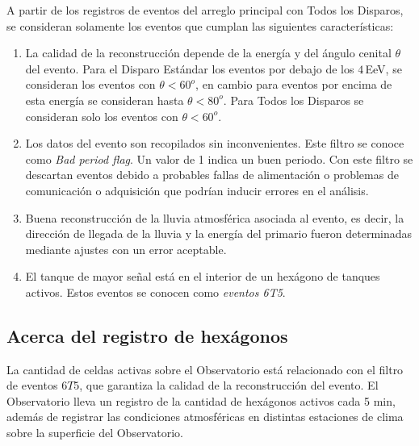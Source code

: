 A partir de los registros de eventos del arreglo principal con Todos los Disparos, se consideran solamente los eventos que cumplan las siguientes características:

    \begin{enumerate}
      \item La calidad de la reconstrucción depende de la energía y del ángulo cenital $\theta$ del evento.  Para el Disparo Estándar los eventos por debajo de los $4\,$EeV, se consideran los eventos con $\theta < 60^o$, en cambio para eventos por encima de esta energía se consideran hasta $\theta < 80^o$. Para Todos los Disparos se consideran solo los eventos con $\theta<60^o$.
      \item Los datos del evento son recopilados sin inconvenientes. Este filtro se conoce como \emph{Bad period flag}. Un valor de 1 indica un buen periodo. Con este filtro se descartan eventos debido a probables fallas de alimentación o problemas de comunicación o adquisición que podrían inducir errores en el análisis.
      \item Buena reconstrucción de la lluvia atmosférica asociada al evento, es decir, la dirección de llegada de la lluvia y la energía del primario fueron determinadas mediante ajustes con un error aceptable.
      \item El tanque de mayor señal está en el interior de un hexágono de tanques activos. Estos eventos se conocen como \textit{eventos 6T5}.
    \end{enumerate}


\subsection{Acerca del registro de hexágonos}\label{hexagonos_rate}

La cantidad de celdas  activas sobre el Observatorio está relacionado con el filtro de eventos $6T5$, que garantiza la calidad de la reconstrucción del evento. El Observatorio lleva un registro de la cantidad de hexágonos activos cada 5 min, además de registrar las condiciones atmosféricas en distintas estaciones de clima sobre la superficie del Observatorio. 


